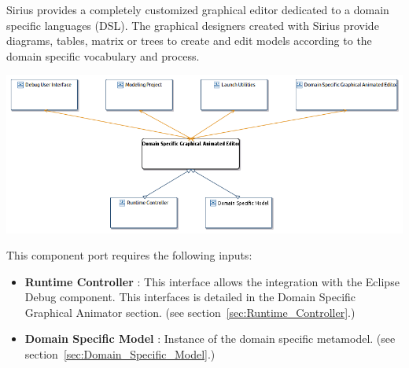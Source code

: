 \documentclass{gemoc} %
\begin{document}
Sirius provides a completely customized graphical editor dedicated to a domain specific languages (DSL). The graphical designers created with Sirius
provide diagrams, tables, matrix or trees to create and edit models according to the domain specific vocabulary and process.
\begin{center}
\includegraphics*[trim=0.0cm 0.0cm 0cm 0.0cm, clip=true]{../images/generated/Generated_Domain_Specific_Graphical_Animated_Editor.png}
\end{center}

This component port requires the following inputs:
\begin{itemize}
  \item \textbf{Runtime Controller} :
This interface allows the integration with the Eclipse Debug component. This interfaces is detailed in the Domain Specific Graphical Animator section.
(see section~\ref{sec:Runtime_Controller}.)
  \item \textbf{Domain Specific Model} :
Instance of the domain specific metamodel.
(see section~\ref{sec:Domain_Specific_Model}.)
\end{itemize}
\end{document}
